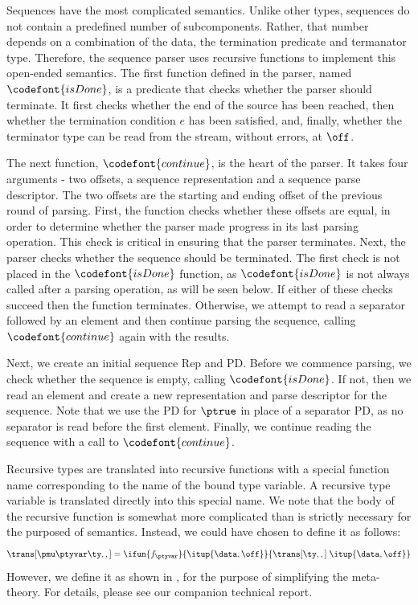 Sequences have the most complicated semantics. Unlike other types,
sequences do not contain a predefined number of subcomponents. Rather,
that number depends on a combination of the data, the termination
predicate and termanator type. Therefore, the sequence parser uses
recursive functions to implement this open-ended semantics. The first
function defined in the parser, named $\codefont{isDone}$, is a
predicate that checks whether the parser should terminate. It first
checks whether the end of the source has been reached, then whether
the termination condition $e$ has been satisfied, and, finally,
whether the terminator type can be read from the stream, without
errors, at $\off$.

The next function, $\codefont{continue}$, is the heart of the parser. It
takes four arguments - two offsets, a sequence representation and a
sequence parse descriptor.  The two offsets are the starting and
ending offset of the previous round of parsing.  First, the function
checks whether these offsets are equal, in order to determine whether
the parser made progress in its last parsing operation. This check is
critical in ensuring that the parser terminates. Next, the parser
checks whether the sequence should be terminated. The first check is
not placed in the $\codefont{isDone}$ function, as $\codefont{isDone}$ is not always
called after a parsing operation, as will be seen below. If either of
these checks succeed then the function terminates.  Otherwise, we
attempt to read a separator followed by an element and then continue
parsing the sequence, calling $\codefont{continue}$ again with the results.

Next, we create an initial sequence Rep and PD. Before we commence
parsing, we check whether the sequence is empty, calling
$\codefont{isDone}$. If not, then we read an element and create a new
representation and parse descriptor for the sequence.  Note that we
use the PD for $\ptrue$ in place of a separator PD, as
no separator is read before the first element.  Finally, we continue
reading the sequence with a call to $\codefont{continue}$.

Recursive types are translated into recursive functions with a special
function name corresponding to the name of the bound type variable. A
recursive type variable is translated directly into this special name.
We note that the body of the recursive function is somewhat more complicated
than is strictly necessary for the purposed of semantics. Instead, we
could have chosen to define it as follows:
\[
  \trans[\pmu \ptyvar \ty,,] = \ifun {f_\ptyvar} {\itup{\data,\off}} 
  {\trans[\ty,,] \; \itup{\data,\off}}
\]
However, we define it as shown in , for the
purpose of simplifying the meta-theory. For details, please see our
companion technical report.

